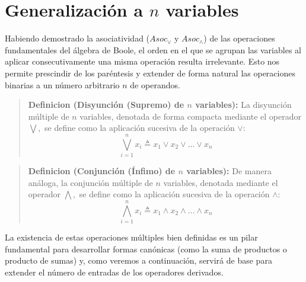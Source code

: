 \section{Generalización a $n$ variables}

Habiendo demostrado la asociatividad ($Asoc_\vee$ y $Asoc_\wedge$) de las operaciones fundamentales del álgebra de Boole, el orden en el que se agrupan las variables al aplicar consecutivamente una misma operación resulta irrelevante. Esto nos permite prescindir de los paréntesis y extender de forma natural las operaciones binarias a un número arbitrario $n$ de operandos.

\begin{quote}\textbf{Definicion (Disyunción (Supremo) de $n$ variables):}\label{or_n_variables}
La disyunción múltiple de $n$ variables, denotada de forma compacta mediante el operador $\bigvee,$ se define como la aplicación sucesiva de la operación $\vee:$
\[ \bigvee_{i=1}^n x_i \triangleq x_1 \vee x_2 \vee \dots \vee x_n \]
\end{quote}

\begin{quote}\textbf{Definicion (Conjunción (Ínfimo) de $n$ variables):}\label{and_n_variables}
De manera análoga, la conjunción múltiple de $n$ variables, denotada mediante el operador $\bigwedge,$ se define como la aplicación sucesiva de la operación $\wedge:$
\[ \bigwedge_{i=1}^n x_i \triangleq x_1 \wedge x_2 \wedge \dots \wedge x_n \]
\end{quote}

La existencia de estas operaciones múltiples bien definidas es un pilar fundamental para desarrollar formas canónicas (como la suma de productos o producto de sumas) y, como veremos a continuación, servirá de base para extender el número de entradas de los operadores derivados.


